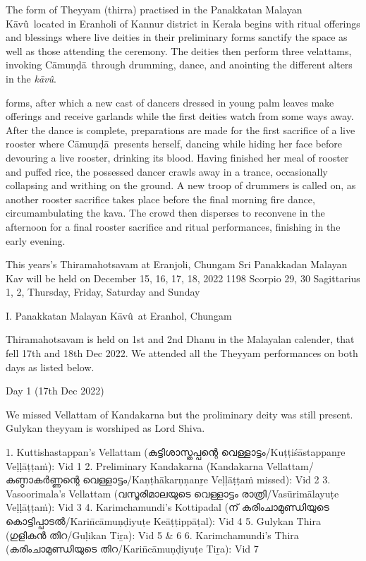 \documentclass[a4paper, 11pt]{article} %
\newcommand{\camunda}[0]{C\={a}mu\d{n}\d{d}\={a}}
\newcommand{\kavu}[0]{\textit{k\={a}v\^{u}}}
\newcommand{\Kavu}[0]{K\={a}v\^{u}}
\begin{document}
The form of Theyyam (thirra) practised in the Panakkatan Malayan \Kavu\ located in Eranholi of Kannur district in Kerala begins with ritual offerings and blessings where live deities in their preliminary forms sanctify the space as well as those attending the ceremony.
The deities then perform three velattams, invoking \camunda\ through drumming, dance, and anointing the different alters in the \kavu.

forms, after which a new cast of dancers dressed in young palm leaves make offerings and receive garlands while the first deities watch from some ways away.
After the dance is complete, preparations are made for the first sacrifice of a live rooster where \camunda\ presents herself, dancing while hiding her face before devouring a live rooster, drinking its blood.
Having finished her meal of rooster and puffed rice, the possessed dancer crawls away in a trance, occasionally collapsing and writhing on the ground. 
A new troop of drummers is called on, as another rooster sacrifice takes place before the final morning fire dance, circumambulating the kava.
The crowd then disperses to reconvene in the afternoon for a final rooster sacrifice and ritual performances, finishing in the early evening.

This years's Thiramahotsavam at Eranjoli, Chungam Sri Panakkadan Malayan Kav will be held on December 15, 16, 17, 18, 2022 1198 Scorpio 29, 30 Sagittarius 1, 2, Thursday, Friday, Saturday and Sunday

I. Panakkatan Malayan \Kavu\ at Eranhol, Chungam

Thiramahotsavam is held on 1st and 2nd Dhanu in the Malayalan calender, that fell 17th and 18th Dec 2022. We attended all the Theyyam performances on both days as listed below.

Day 1 (17th Dec 2022)

We missed Vellattam of Kandakarna but the proliminary deity was still present. Gulykan theyyam is worshiped as Lord Shiva.

1. Kuttishastappan's Vellattam (കുട്ടിശാസ്തപ്പന്റെ വെള്ളാട്ടം/Kuṭṭiśāstappanṟe Veḷḷāṭṭaṁ): Vid 1
2. Preliminary Kandakarna (Kandakarna Vellattam/കണ്ഠാകർണ്ണന്റെ വെള്ളാട്ടം/Kaṇṭhākarṇṇanṟe Veḷḷāṭṭaṁ missed): Vid 2
3. Vasoorimala's Vellattam (വസൂരിമാലയുടെ വെള്ളാട്ടം രാത്രി/Vasūrimālayuṭe Veḷḷāṭṭaṁ): Vid 3
4. Karimchamundi's Kottipadal (ന് കരിംചാമുണ്ഡിയുടെ കൊട്ടിപ്പാടൽ/Karin̄cāmuṇḍiyuṭe Keāṭṭippāṭal): Vid 4
5. Gulykan Thira (ഗുളികൻ തിറ/Guḷikan Tiṟa): Vid 5 & 6
6. Karimchamundi's Thira (കരിംചാമുണ്ഡിയുടെ തിറ/Karin̄cāmuṇḍiyuṭe Tiṟa): Vid 7
\end{document}
